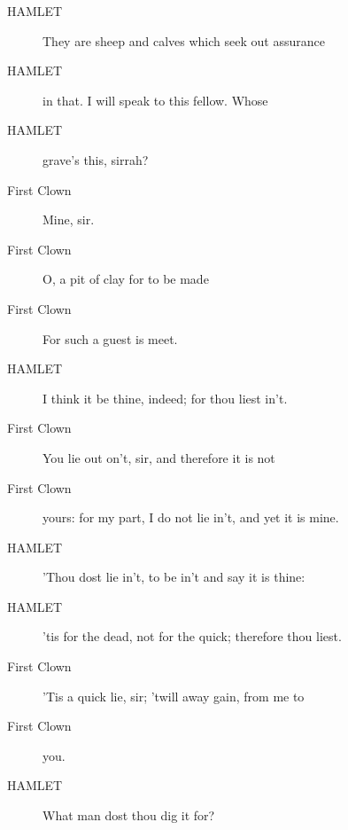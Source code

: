 \documentclass{article}
\begin{document}
\begin{description}
            
\item[HAMLET] They are sheep and calves which seek out assurance
\item[HAMLET] in that. I will speak to this fellow. Whose
\item[HAMLET] grave's this, sirrah?
\end{description}
          
\begin{description}
            
\item[First Clown] Mine, sir.
\item[First Clown] O, a pit of clay for to be made
\item[First Clown] For such a guest is meet.
\end{description}
          
\begin{description}
            
\item[HAMLET] I think it be thine, indeed; for thou liest in't.
\end{description}
          
\begin{description}
            
\item[First Clown] You lie out on't, sir, and therefore it is not
\item[First Clown] yours: for my part, I do not lie in't, and yet it is mine.
\end{description}
          
\begin{description}
            
\item[HAMLET] 'Thou dost lie in't, to be in't and say it is thine:
\item[HAMLET] 'tis for the dead, not for the quick; therefore thou liest.
\end{description}
          
\begin{description}
            
\item[First Clown] 'Tis a quick lie, sir; 'twill away gain, from me to
\item[First Clown] you.
\end{description}
          
\begin{description}
            
\item[HAMLET] What man dost thou dig it for?
\end{description}
          
\end{document}

